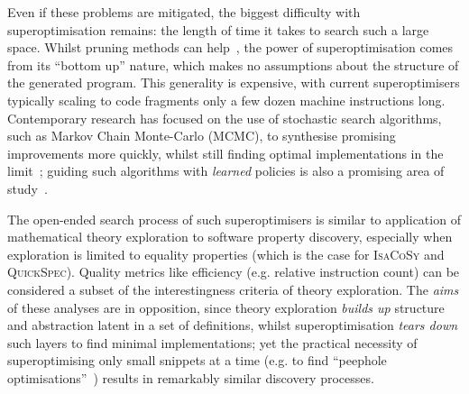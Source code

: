 Even if these problems are mitigated, the biggest difficulty with
superoptimisation remains: the length of time it takes to search such a
large space. Whilst pruning methods can help~\cite{phothilimthana2016scaling},
the power of superoptimisation comes from its ``bottom up'' nature, which makes
no assumptions about the structure of the generated program. This generality is
expensive, with current superoptimisers typically scaling to code fragments only
a few dozen machine instructions long. Contemporary research has focused on the
use of stochastic search algorithms, such as Markov Chain Monte-Carlo (MCMC), to
synthesise promising improvements more quickly, whilst still finding optimal
implementations in the limit~\cite{schkufza2013stochastic}; guiding such
algorithms with \emph{learned} policies is also a promising area of
study~\cite{mudigonda2017learning}.

The open-ended search process of such superoptimisers is similar to application
of mathematical theory exploration to software property discovery, especially
when exploration is limited to equality properties (which is the case for
\textsc{IsaCoSy} and \textsc{QuickSpec}). Quality metrics like efficiency (e.g.
relative instruction count) can be considered a subset of the interestingness
criteria of theory exploration. The \emph{aims} of these analyses are in
opposition, since theory exploration \emph{builds up} structure and abstraction
latent in a set of definitions, whilst superoptimisation \emph{tears down} such
layers to find minimal implementations; yet the practical necessity of
superoptimising only small snippets at a time (e.g. to find ``peephole
optimisations''~\cite{Bansal.Aiken:2006}) results in remarkably similar
discovery processes.
